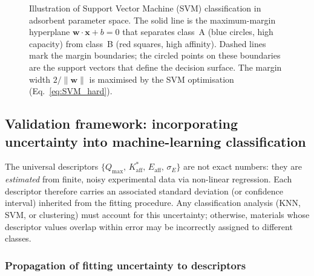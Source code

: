\begin{figure}[H]
		\caption{Illustration of Support Vector Machine (SVM)
			classification in adsorbent parameter space.
			The solid line is the maximum-margin hyperplane
			$\mathbf{w}\cdot\mathbf{x}+b=0$ that separates
			class~A (blue circles, high capacity) from class~B
			(red squares, high affinity).  Dashed lines mark the
			margin boundaries; the circled points on these
			boundaries are the support vectors that define the
			decision surface.  The margin width
			$2/\|\mathbf{w}\|$ is maximised by the SVM
			optimisation (Eq.~\ref{eq:SVM_hard}).}
		\label{fig:SVM_illustration}
	\end{figure}

	\subsection{Validation framework: incorporating uncertainty into
		machine-learning classification}

	The universal descriptors
	$\{Q_{\max},\, K_{\mathrm{aff}}^{\ast},\, E_{\mathrm{aff}},\,
	\sigma_E\}$ are not exact numbers: they are \emph{estimated}
	from finite, noisy experimental data via non-linear regression.
	Each descriptor therefore carries an associated standard
	deviation (or confidence interval) inherited from the fitting
	procedure.  Any classification analysis (KNN, SVM, or
	clustering) must account for this uncertainty; otherwise,
	materials whose descriptor values overlap within error may be
	incorrectly assigned to different classes.

	\subsubsection{Propagation of fitting uncertainty to descriptors}

